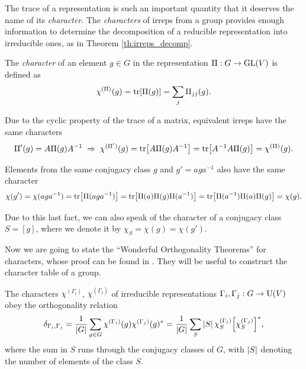 The trace of a representation is such an important quantity that it deserves the name of its \textit{character}. The \textit{characters} of irreps from a group provides enough information to determine the decomposition of a reducible representation into irreducible ones, as in Theorem \ref{th:irreps_decomp}.

\begin{definition}
The \textit{character} of an element $g \in G$ in the representation $\Pi: G \to {\text{GL}}(V)$ is defined as
\begin{equation} \label{eq:character}
\chi^{(\Pi)}(g) = \tr[\Pi(g)] = \sum_{j} \Pi_{jj}(g).
\end{equation}
\end{definition}
Due to the cyclic property of the trace of a matrix, equivalent irreps have the same characters
$$
\Pi'(g) = A\Pi(g)A^{-1} \; \Rightarrow \; \chi^{(\Pi')}(g) = \tr[A \Pi(g) A^{-1}] =  \tr[A^{-1}A \Pi(g)] = \chi^{(\Pi)}(g).
$$

Elements from the same conjugacy class $g$ and $g' = a g a^{-1}$ also have the same character
$$
\chi(g') = \chi(aga^{-1}) = \tr[\Pi(aga^{-1})] = \tr[\Pi(a)\Pi(g)\Pi(a^{-1})] = \tr[\Pi(a^{-1})\Pi(a)\Pi(g)] = \chi(g).
$$

Due to this last fact, we can also speak of the character of a conjugacy class $S = [g]$, where we denote it by $\chi_S = \chi(g) = \chi(g')$.

\n

Now we are going to state the ``Wonderful Orthogonality Theorems'' for characters, whose proof can be found in \cite{dresselhaus, hamermesh}. They will be useful to construct the character table of a group.

\begin{theorem} \label{th:1st-wot}
The characters $\chi^{(\Gamma_i)}$, $\chi^{(\Gamma_j)}$ of irreducible representations $\Gamma_i, \Gamma_j: G \to {\text{U}}(V)$ obey the orthogonality relation
\begin{equation} \label{eq:1st-wot}
\delta_{\Gamma_i, \Gamma_j} =
\frac{1}{\abs{G}} \sum_{g \in G} \chi^{(\Gamma_i)}(g) \chi^{(\Gamma_j)}(g)^* =
\frac{1}{\abs{G}} \sum_{S} \abs{S} \, \chi^{(\Gamma_i)}_S \qty[\chi^{(\Gamma_j)}_S]^*,
\end{equation}
where the sum in $S$ runs through the conjugacy classes of $G$, with $\abs{S}$ denoting the number of elements of the class $S$.
\end{theorem}

